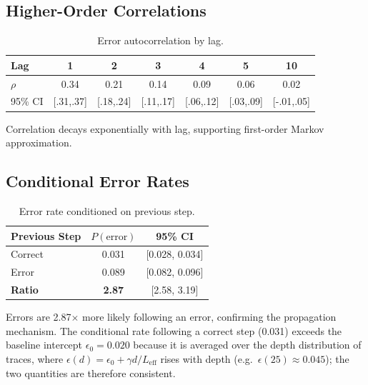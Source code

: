\documentclass{article}
\theoremstyle{plain}
\theoremstyle{definition}
\theoremstyle{remark}
\newcommand{\Leff}{L_{\mathrm{eff}}}
\begin{document}
\subsection{Higher-Order Correlations}

\begin{table}[h]
\centering
\caption{Error autocorrelation by lag.}
\label{tab:autocorr}
\small
\begin{tabular}{@{}lcccccc@{}}
\toprule
\textbf{Lag} & 1 & 2 & 3 & 4 & 5 & 10 \\
\midrule
$\rho$ & 0.34 & 0.21 & 0.14 & 0.09 & 0.06 & 0.02 \\
95\% CI & [.31,.37] & [.18,.24] & [.11,.17] & [.06,.12] & [.03,.09] & [-.01,.05] \\
\bottomrule
\end{tabular}
\end{table}

Correlation decays exponentially with lag, supporting first-order Markov approximation.

\subsection{Conditional Error Rates}

\begin{table}[h]
\centering
\caption{Error rate conditioned on previous step.}
\label{tab:conditional_error}
\small
\begin{tabular}{@{}lcc@{}}
\toprule
\textbf{Previous Step} & \textbf{$P(\text{error})$} & \textbf{95\% CI} \\
\midrule
Correct & 0.031 & [0.028, 0.034] \\
Error & 0.089 & [0.082, 0.096] \\
\textbf{Ratio} & \textbf{2.87} & [2.58, 3.19] \\
\bottomrule
\end{tabular}
\end{table}

Errors are 2.87$\times$ more likely following an error, confirming the propagation mechanism. The conditional rate following a correct step (0.031) exceeds the baseline intercept $\epsilon_0 = 0.020$ because it is averaged over the depth distribution of traces, where $\epsilon(d) = \epsilon_0 + \gamma d/\Leff$ rises with depth (e.g.\ $\epsilon(25) \approx 0.045$); the two quantities are therefore consistent.

\end{document}
